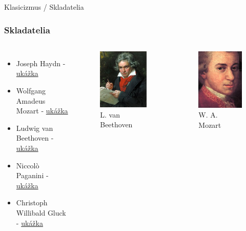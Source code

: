 \documentclass[dvipsnames]{beamer}
\begin{document}
\begin{frame}{\small \textcolor{g}{Klasicizmus} / \Large Skladatelia}
	\subsubsection{Skladatelia}
	\begin{columns}

	\begin{itemize}
		\item Joseph Haydn - \href{https://www.gtsforum.xyz/haydn.mp3}{ukážka}
		\item Wolfgang Amadeus Mozart - \href{https://www.gtsforum.xyz/mozart.mp3}{ukážka}
		\item Ludwig van Beethoven - \href{https://www.gtsforum.xyz/beethoven.mp3}{ukážka}
		\item Niccolò Paganini - \href{https://www.gtsforum.xyz/paganini.ogg}{ukážka}
		\item Christoph  Willibald Gluck - \href{https://www.gtsforum.xyz/gluck.ogg}{ukážka}
	\end{itemize}
		\begin{figure}
			\includegraphics[scale=0.45]{beethoven}
			\caption{L. van Beethoven}
		\end{figure}
		\begin{figure}
			\includegraphics[scale=0.45]{mozart}
			\caption{W. A. Mozart}
		\end{figure}

	\end{columns}
\end{frame}
\end{document}
